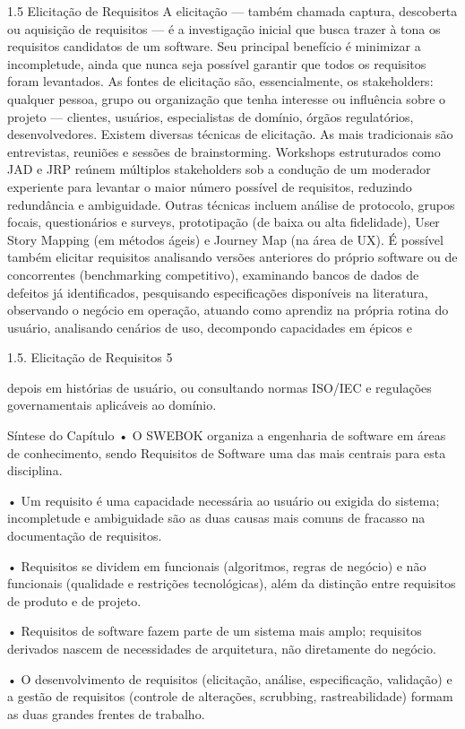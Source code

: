 1.5 Elicitação de Requisitos A elicitação — também chamada captura, descoberta ou aquisição de requisitos — é a investigação inicial que busca trazer à tona os requisitos candidatos de um software. Seu principal benefício é minimizar a incompletude, ainda que nunca seja possível garantir que todos os requisitos foram levantados. As fontes de elicitação são, essencialmente, os stakeholders: qualquer pessoa, grupo ou organização que tenha interesse ou influência sobre o projeto — clientes, usuários, especialistas de domínio, órgãos regulatórios, desenvolvedores. Existem diversas técnicas de elicitação. As mais tradicionais são entrevistas, reuniões e sessões de brainstorming. Workshops estruturados como JAD e JRP reúnem múltiplos stakeholders sob a condução de um moderador experiente para levantar o maior número possível de requisitos, reduzindo redundância e ambiguidade. Outras técnicas incluem análise de protocolo, grupos focais, questionários e surveys, prototipação (de baixa ou alta fidelidade), User Story Mapping (em métodos ágeis) e Journey Map (na área de UX). É possível também elicitar requisitos analisando versões anteriores do próprio software ou de concorrentes (benchmarking competitivo), examinando bancos de dados de defeitos já identificados, pesquisando especificações disponíveis na literatura, observando o negócio em operação, atuando como aprendiz na própria rotina do usuário, analisando cenários de uso, decompondo capacidades em épicos e

1.5. Elicitação de Requisitos 5

depois em histórias de usuário, ou consultando normas ISO/IEC e regulações governamentais aplicáveis ao domínio.

Síntese do Capítulo • O SWEBOK organiza a engenharia de software em áreas de conhecimento, sendo Requisitos de Software uma das mais centrais para esta disciplina.

• Um requisito é uma capacidade necessária ao usuário ou exigida do sistema; incompletude e ambiguidade são as duas causas mais comuns de fracasso na documentação de requisitos.

• Requisitos se dividem em funcionais (algoritmos, regras de negócio) e não funcionais (qualidade e restrições tecnológicas), além da distinção entre requisitos de produto e de projeto.

• Requisitos de software fazem parte de um sistema mais amplo; requisitos derivados nascem de necessidades de arquitetura, não diretamente do negócio.

• O desenvolvimento de requisitos (elicitação, análise, especificação, validação) e a gestão de requisitos (controle de alterações, scrubbing, rastreabilidade) formam as duas grandes frentes de trabalho.

